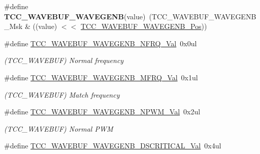 \begin{DoxyCompactItemize}
\item 
\hypertarget{group___s_a_m_l21___t_c_c_ga6f52a58cfd54ac978fd2d47a6d1dfc29}{}\#define {\bfseries T\+C\+C\+\_\+\+W\+A\+V\+E\+B\+U\+F\+\_\+\+W\+A\+V\+E\+G\+E\+N\+B}(value)~(T\+C\+C\+\_\+\+W\+A\+V\+E\+B\+U\+F\+\_\+\+W\+A\+V\+E\+G\+E\+N\+B\+\_\+\+Msk \& ((value) $<$$<$ \hyperlink{group___s_a_m_l21___t_c_c_ga873098e9f57606f2bb54409caa7482f9}{T\+C\+C\+\_\+\+W\+A\+V\+E\+B\+U\+F\+\_\+\+W\+A\+V\+E\+G\+E\+N\+B\+\_\+\+Pos}))\label{group___s_a_m_l21___t_c_c_ga6f52a58cfd54ac978fd2d47a6d1dfc29}

\item 
\hypertarget{group___s_a_m_l21___t_c_c_gaa0a808061ca6dd78cc111a4530251f71}{}\#define \hyperlink{group___s_a_m_l21___t_c_c_gaa0a808061ca6dd78cc111a4530251f71}{T\+C\+C\+\_\+\+W\+A\+V\+E\+B\+U\+F\+\_\+\+W\+A\+V\+E\+G\+E\+N\+B\+\_\+\+N\+F\+R\+Q\+\_\+\+Val}~0x0ul\label{group___s_a_m_l21___t_c_c_gaa0a808061ca6dd78cc111a4530251f71}

\begin{DoxyCompactList}\small\item\em (T\+C\+C\+\_\+\+W\+A\+V\+E\+B\+U\+F) Normal frequency \end{DoxyCompactList}\item 
\hypertarget{group___s_a_m_l21___t_c_c_ga9cb6a04b3777b40fee042239565be89b}{}\#define \hyperlink{group___s_a_m_l21___t_c_c_ga9cb6a04b3777b40fee042239565be89b}{T\+C\+C\+\_\+\+W\+A\+V\+E\+B\+U\+F\+\_\+\+W\+A\+V\+E\+G\+E\+N\+B\+\_\+\+M\+F\+R\+Q\+\_\+\+Val}~0x1ul\label{group___s_a_m_l21___t_c_c_ga9cb6a04b3777b40fee042239565be89b}

\begin{DoxyCompactList}\small\item\em (T\+C\+C\+\_\+\+W\+A\+V\+E\+B\+U\+F) Match frequency \end{DoxyCompactList}\item 
\hypertarget{group___s_a_m_l21___t_c_c_ga60825478ecd30e09b62be778006fcb85}{}\#define \hyperlink{group___s_a_m_l21___t_c_c_ga60825478ecd30e09b62be778006fcb85}{T\+C\+C\+\_\+\+W\+A\+V\+E\+B\+U\+F\+\_\+\+W\+A\+V\+E\+G\+E\+N\+B\+\_\+\+N\+P\+W\+M\+\_\+\+Val}~0x2ul\label{group___s_a_m_l21___t_c_c_ga60825478ecd30e09b62be778006fcb85}

\begin{DoxyCompactList}\small\item\em (T\+C\+C\+\_\+\+W\+A\+V\+E\+B\+U\+F) Normal P\+W\+M \end{DoxyCompactList}\item 
\hypertarget{group___s_a_m_l21___t_c_c_gaac09ec49f12c883922a3d9e26e19d210}{}\#define \hyperlink{group___s_a_m_l21___t_c_c_gaac09ec49f12c883922a3d9e26e19d210}{T\+C\+C\+\_\+\+W\+A\+V\+E\+B\+U\+F\+\_\+\+W\+A\+V\+E\+G\+E\+N\+B\+\_\+\+D\+S\+C\+R\+I\+T\+I\+C\+A\+L\+\_\+\+Val}~0x4ul\label{group___s_a_m_l21___t_c_c_gaac09ec49f12c883922a3d9e26e19d210}


\end{DoxyCompactItemize}
